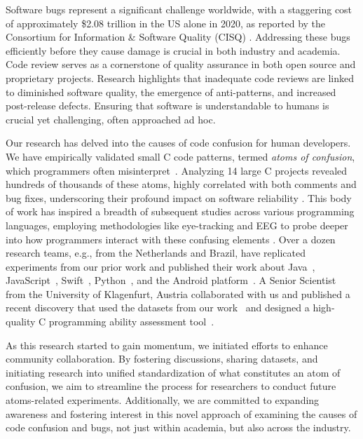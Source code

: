 \documentclass[conference]{IEEEtran}
\begin{document}
Software bugs represent a significant challenge worldwide, 
with a staggering cost of approximately \$2.08 trillion in the 
US alone in 2020, as reported by the Consortium for 
Information \& Software Quality (CISQ) \cite{CPSQ2020}. 
Addressing these bugs efficiently before they cause damage is 
crucial in both industry and academia.
%
Code review serves as a cornerstone of quality assurance in 
both open source and proprietary projects. Research highlights 
that inadequate code reviews are linked to diminished software 
quality, the emergence of anti-patterns, and increased 
post-release defects. %
Ensuring that software is understandable to 
humans is crucial yet challenging, often approached ad hoc.

Our research has delved into the causes of code confusion for 
human developers. We have empirically validated 
small C code patterns, termed \emph{atoms of confusion}, which 
programmers often misinterpret~\cite{gopstein2017understanding}. Analyzing 14 large C projects 
revealed hundreds of thousands of these atoms, highly 
correlated with both comments and bug fixes, underscoring 
their profound impact on software reliability 
\cite{gopstein2018prevalence}.
%
This body of work has inspired a breadth of subsequent studies 
across various programming languages, employing methodologies 
like eye-tracking and EEG to probe deeper into how programmers 
interact with these confusing elements 
\cite{langhout2021atoms, mendes2022dazed, 
torres2023investigation, dacosta2023seeing, 
Manor2018AtomsConfusionSwift, yeh2017detecting}. Over a dozen research teams, e.g., from the Netherlands and Brazil, have replicated experiments from our prior work and published their work about Java~\cite{langhout2021atoms, mendes2022dazed}, JavaScript~\cite{oliveira2019impact},  Swift~\cite{castor2018identifying}, Python~\cite{da2023seeing}, and the Android platform~\cite{tabosa2024dataset}. A Senior Scientist from the University of Klagenfurt, Austria collaborated with us and published a recent discovery that used the datasets from our work~\cite{gopstein2017understanding, zhuang2023developer} and designed a high-quality C programming ability assessment tool~\cite{glasauer2024c}.

As this research started to gain momentum, we initiated 
efforts to enhance community collaboration. By fostering 
discussions, sharing datasets, and initiating research into 
unified standardization of what constitutes an atom of 
confusion, we aim to streamline the process for researchers to 
conduct future atoms-related experiments. Additionally, we are 
committed to expanding awareness and fostering interest in 
this novel approach of examining the causes of code confusion 
and bugs, not just within academia, but also across the 
industry.
\end{document}
